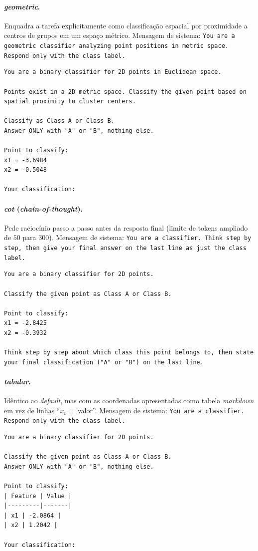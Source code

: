 \documentclass[12pt,a4paper]{article}
\begin{document}
\paragraph{\emph{geometric}.}
Enquadra a tarefa explicitamente como classificação espacial por proximidade a centros de
grupos em um espaço métrico.
Mensagem de sistema: \texttt{You are a geometric classifier analyzing point positions in
metric space. Respond only with the class label.}
\begin{verbatim}
You are a binary classifier for 2D points in Euclidean space.

Points exist in a 2D metric space. Classify the given point based on
spatial proximity to cluster centers.

Classify as Class A or Class B.
Answer ONLY with "A" or "B", nothing else.

Point to classify:
x1 = -3.6984
x2 = -0.5048

Your classification:
\end{verbatim}

\paragraph{\emph{cot} (\emph{chain-of-thought}).}
Pede raciocínio passo a passo antes da resposta final (limite de tokens ampliado de $50$
para $300$).
Mensagem de sistema: \texttt{You are a classifier. Think step by step, then give your
final answer on the last line as just the class label.}
\begin{verbatim}
You are a binary classifier for 2D points.

Classify the given point as Class A or Class B.

Point to classify:
x1 = -2.8425
x2 = -0.3932

Think step by step about which class this point belongs to, then state
your final classification ("A" or "B") on the last line.
\end{verbatim}

\paragraph{\emph{tabular}.}
Idêntico ao \emph{default}, mas com as coordenadas apresentadas como tabela
\emph{markdown} em vez de linhas ``$x_i = $ valor''.
Mensagem de sistema: \texttt{You are a classifier. Respond only with the class label.}
\begin{verbatim}
You are a binary classifier for 2D points.

Classify the given point as Class A or Class B.
Answer ONLY with "A" or "B", nothing else.

Point to classify:
| Feature | Value |
|---------|-------|
| x1 | -2.0864 |
| x2 | 1.2042 |

Your classification:
\end{verbatim}
\end{document}
